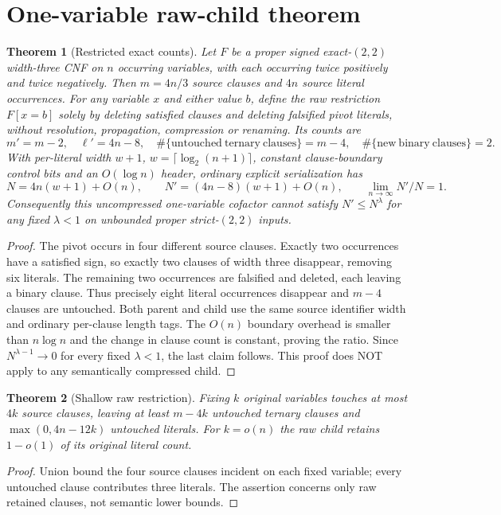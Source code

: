 \documentclass[11pt]{article}
\newtheorem{theorem}{Theorem}
\begin{document}
\section{One-variable raw-child theorem}
\begin{theorem}[Restricted exact counts]
Let $F$ be a proper signed exact-$(2,2)$ width-three CNF on $n$ occurring
variables, with each occurring twice positively and twice negatively.
Then $m=4n/3$ source clauses and $4n$ source literal occurrences. For any
variable $x$ and either value $b$, define the \emph{raw} restriction
$F[x=b]$ solely by deleting satisfied clauses and deleting falsified
pivot literals, without resolution, propagation, compression or renaming.
Its counts are
\[
m'=m-2,\quad \ell'=4n-8,\quad
\#\{\mathrm{untouched\ ternary\ clauses}\}=m-4,\quad
\#\{\mathrm{new\ binary\ clauses}\}=2.
\]
With per-literal width $w+1$, $w=\lceil\log_2(n+1)\rceil$, constant
clause-boundary control bits and an $O(\log n)$ header, ordinary explicit
serialization has
\[
N=4n(w+1)+O(n),\qquad N'=(4n-8)(w+1)+O(n),
\qquad \lim_{n\to\infty}N'/N=1.
\]
Consequently this \emph{uncompressed one-variable cofactor} cannot
satisfy $N'\le N^\lambda$ for any fixed $\lambda<1$ on
unbounded proper strict-$(2,2)$ inputs.
\end{theorem}
\begin{proof}
The pivot occurs in four different source clauses. Exactly two
occurrences have a satisfied sign, so exactly two clauses of width
three disappear, removing six literals. The remaining two occurrences
are falsified and deleted, each leaving a binary clause. Thus precisely
eight literal occurrences disappear and $m-4$ clauses are untouched.
Both parent and child use the same source identifier width and ordinary
per-clause length tags. The $O(n)$ boundary overhead is smaller than
$n\log n$ and the change in clause count is constant, proving the ratio.
Since $N^{\lambda-1}\to0$ for every fixed $\lambda<1$, the last claim
follows. This proof does NOT apply to any semantically compressed child.
\end{proof}

\begin{theorem}[Shallow raw restriction]
Fixing $k$ original variables touches at most $4k$ source clauses, leaving
at least $m-4k$ untouched ternary clauses and
$\max(0,4n-12k)$ untouched literals. For $k=o(n)$ the raw child
retains $1-o(1)$ of its original literal count.
\end{theorem}
\begin{proof}
Union bound the four source clauses incident on each fixed variable;
every untouched clause contributes three literals. The assertion
concerns only raw retained clauses, not semantic lower bounds.
\end{proof}
\end{document}
